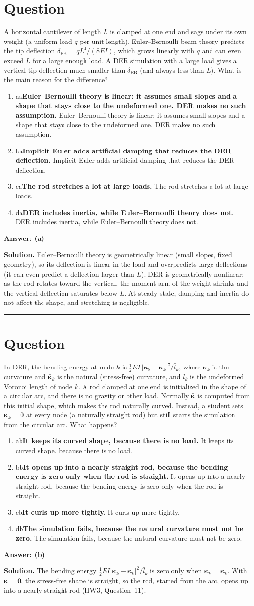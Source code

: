 \documentclass[letterpaper,11pt]{article}
\newcounter{qnum}
\newcommand{\opt}[3]{\item \if#1#2{\boldmath\textbf{#3}} \quad \textcolor{OliveGreen}{\checkmark}\else #3\fi}
\newcommand{\sol}[7]{%
  \stepcounter{qnum}%
  \section*{Question \theqnum}
  #1
  \begin{enumerate}[label=(\alph*)]
    \opt{a}{#6}{#2}
    \opt{b}{#6}{#3}
    \opt{c}{#6}{#4}
    \opt{d}{#6}{#5}
  \end{enumerate}
  \vspace{1mm}
  \textbf{Answer: (#6)}

  \textbf{Solution.} #7

  \vspace{2mm}\hrule
}
\begin{document}
%
%
\sol{A horizontal cantilever of length $L$ is clamped at one end and sags under its own weight (a uniform load $q$ per unit length). Euler--Bernoulli beam theory predicts the tip deflection $\delta_{\text{EB}} = qL^4/(8EI)$, which grows linearly with $q$ and can even exceed $L$ for a large enough load. A DER simulation with a large load gives a vertical tip deflection much smaller than $\delta_{\text{EB}}$ (and always less than $L$). What is the main reason for the difference?}
  {Euler--Bernoulli theory is linear: it assumes small slopes and a shape that stays close to the undeformed one. DER makes no such assumption.}
  {Implicit Euler adds artificial damping that reduces the DER deflection.}
  {The rod stretches a lot at large loads.}
  {DER includes inertia, while Euler--Bernoulli theory does not.}
  {a}
  {Euler--Bernoulli theory is geometrically linear (small slopes, fixed geometry), so its deflection is linear in the load and overpredicts large deflections (it can even predict a deflection larger than $L$). DER is geometrically nonlinear: as the rod rotates toward the vertical, the moment arm of the weight shrinks and the vertical deflection saturates below $L$. At steady state, damping and inertia do not affect the shape, and stretching is negligible.}

%
%
\sol{In DER, the bending energy at node $k$ is $\frac{1}{2} EI\, |\boldsymbol{\kappa}_k - \bar{\boldsymbol{\kappa}}_k|^2 / \bar{l}_k$, where $\boldsymbol{\kappa}_k$ is the curvature and $\bar{\boldsymbol{\kappa}}_k$ is the natural (stress-free) curvature, and $\bar{l}_k$ is the undeformed Voronoi length of node $k$. A rod clamped at one end is initialized in the shape of a circular arc, and there is no gravity or other load. Normally $\bar{\boldsymbol{\kappa}}$ is computed from this initial shape, which makes the rod naturally curved. Instead, a student sets $\bar{\boldsymbol{\kappa}}_k = \mathbf{0}$ at every node (a naturally straight rod) but still starts the simulation from the circular arc. What happens?}
  {It keeps its curved shape, because there is no load.}
  {It opens up into a nearly straight rod, because the bending energy is zero only when the rod is straight.}
  {It curls up more tightly.}
  {The simulation fails, because the natural curvature must not be zero.}
  {b}
  {The bending energy $\frac{1}{2}EI|\boldsymbol{\kappa}_k - \bar{\boldsymbol{\kappa}}_k|^2/\bar{l}_k$ is zero only when $\boldsymbol{\kappa}_k = \bar{\boldsymbol{\kappa}}_k$. With $\bar{\boldsymbol{\kappa}} = \mathbf{0}$, the stress-free shape is straight, so the rod, started from the arc, opens up into a nearly straight rod (HW3, Question~11).}
\end{document}
